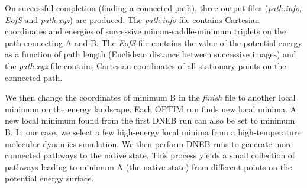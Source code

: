 \documentclass[journal=jacsat]{achemso}
\begin{document}
On successful completion (finding a connected path), three output files (\emph{path.info}, \emph{EofS} and \emph{path.xyz}) are produced. The \emph{path.info} file contains Cartesian coordinates and energies of successive minum-saddle-minimum triplets on the path connecting A and B. The \emph{EofS} file contains the value of the potential energy as a function of path length (Euclidean distance between successive images) and the \emph{path.xyz} file contains Cartesian coordinates of all stationary points on the connected path. 

We then change the coordinates of minimum B  in the \emph{finish} file to another local minimum on the energy landscape. Each OPTIM run finds new local minima. A new local minimum found from the first DNEB run can also be set to minimum B. In our case, we select a few high-energy local minima from a high-temperature molecular dynamics simulation. We then perform DNEB runs to generate more connected pathways to the native state. This process yields a small collection of pathways leading to minimum A (the native state) from different points on the potential energy surface. 
\end{document}
